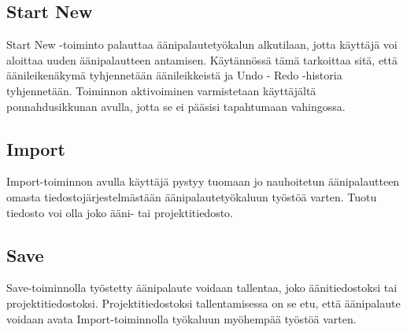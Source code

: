 \documentclass[utf8]{gradu3}
\begin{document}
\subsection{Start New}

Start New -toiminto palauttaa äänipalautetyökalun alkutilaan, jotta käyttäjä voi aloittaa uuden äänipalautteen antamisen. Käytännössä tämä tarkoittaa sitä, että äänileikenäkymä tyhjennetään äänileikkeistä ja Undo - Redo -historia tyhjennetään. Toiminnon aktivoiminen varmistetaan käyttäjältä ponnahdusikkunan avulla, jotta se ei pääsisi tapahtumaan vahingossa.

\subsection{Import}

Import-toiminnon avulla käyttäjä pystyy tuomaan jo nauhoitetun äänipalautteen omasta tiedostojärjestelmästään äänipalautetyökaluun työstöä varten. Tuotu tiedosto voi olla joko ääni- tai projektitiedosto.

\subsection{Save}

Save-toiminnolla työstetty äänipalaute voidaan tallentaa, joko äänitiedostoksi tai projektitiedostoksi. Projektitiedostoksi tallentamisessa on se etu, että äänipalaute voidaan avata Import-toiminnolla työkaluun myöhempää työstöä varten.
\end{document}
